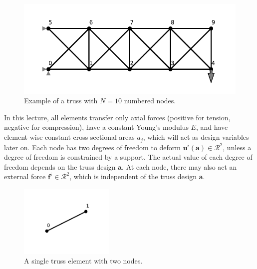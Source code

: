 \begin{figure}[!htpb]
    \centering
    \includegraphics[width=\textwidth]{figures/truss_sample.pdf}
    \caption{Example of a truss with $N=10$ numbered nodes.}
    \label{fig:truss_example}
\end{figure}

In this lecture, all elements transfer only axial forces (positive for tension, negative for compression), have a constant Young's modulus $E$, and have element-wise constant cross sectional areas $a_j$, which will act as design variables later on. Each node has two degrees of freedom to deform $\mathbf{u}^i (\mathbf{a}) \in \mathcal{R}^2$, unless a degree of freedom is constrained by a support. The actual value of each degree of freedom depends on the truss design $\mathbf{a}$. At each node, there may also act an external force $\mathbf{f}^i \in \mathcal{R}^2$, which is independent of the truss design $\mathbf{a}$.

\begin{figure}[!htpb]
    \centering
    \includegraphics[width=0.4\textwidth]{figures/single_truss.pdf}
    \caption{A single truss element with two nodes.}
    \label{fig:single_truss}
\end{figure}



